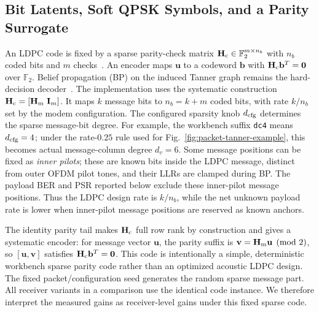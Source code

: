 \documentclass[journal]{IEEEtran}
\newcommand{\F}{\mathbb{F}}
\newcommand{\T}{^{T}}
\newcommand{\cfg}[1]{\texttt{#1}}
\newcommand{\Hc}{\mathbf H_{\rm c}}
\newcommand{\Hm}{\mathbf H_{\rm m}}
\begin{document}
\subsection{Bit Latents, Soft QPSK Symbols, and a Parity Surrogate}
\label{ssec:ldpc}
An LDPC code is fixed by a sparse parity-check matrix $\Hc\in\F_2^{m\times
n_b}$ with $n_b$ coded bits and $m$ checks~\cite{gallager1963ldpc}. An encoder
maps $\mathbf u$ to a codeword $\mathbf b$ with $\Hc\mathbf b\T=\mathbf 0$
over $\F_2$. Belief propagation (BP) on the induced Tanner graph remains the
hard-decision decoder~\cite{richardson2008modern}. The implementation uses the
systematic construction $\Hc=[\Hm\ \mathbf I_m]$. It maps $k$ message bits to
$n_b=k+m$ coded bits, with rate $k/n_b$ set by the modem configuration. The
configured sparsity knob $d_{\rm cfg}$ determines the sparse message-bit degree.
For example, the workbench suffix \cfg{dc4} means $d_{\rm cfg}=4$; under the
rate-$0.25$ rule used for Fig.~\ref{fig:packet-tanner-example}, this becomes
actual message-column degree $d_v=6$. Some message
positions can be fixed as \emph{inner pilots}; these are known bits inside the
LDPC message, distinct from outer OFDM pilot tones, and their LLRs are clamped
during BP. The payload BER and PSR reported below exclude these inner-pilot
message positions. Thus the LDPC design rate is $k/n_b$, while the net unknown
payload rate is lower when inner-pilot message positions are reserved as known
anchors.

The identity parity tail makes $\Hc$ full row rank by construction and gives a
systematic encoder: for message vector $\mathbf u$, the parity suffix is
$\mathbf v=\Hm\mathbf u \pmod 2$, so $[\mathbf u,\mathbf v]$ satisfies
$\Hc\mathbf b\T=\mathbf 0$. This code is intentionally a simple, deterministic
workbench sparse parity code rather than an optimized acoustic LDPC design. The
fixed packet/configuration seed generates the random sparse message part. All
receiver variants in a comparison use the identical code instance. We therefore
interpret the measured gains as receiver-level gains under this fixed sparse
code.
\end{document}
